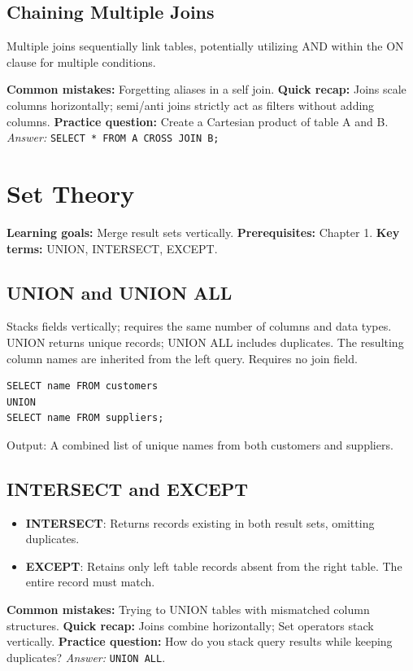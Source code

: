 \documentclass[12pt, a4paper]{article}
\begin{document}
\subsection{Chaining Multiple Joins}
Multiple joins sequentially link tables, potentially utilizing AND within the ON clause for multiple conditions.

\textbf{Common mistakes:} Forgetting aliases in a self join.
\textbf{Quick recap:} Joins scale columns horizontally; semi/anti joins strictly act as filters without adding columns.
\textbf{Practice question:} Create a Cartesian product of table A and B.
\textit{Answer:} \texttt{SELECT * FROM A CROSS JOIN B;}

\section{Set Theory}
\textbf{Learning goals:} Merge result sets vertically.
\textbf{Prerequisites:} Chapter 1.
\textbf{Key terms:} UNION, INTERSECT, EXCEPT.

\subsection{UNION and UNION ALL}
Stacks fields vertically; requires the same number of columns and data types. UNION returns unique records; UNION ALL includes duplicates. The resulting column names are inherited from the left query. Requires no join field.

\begin{verbatim}
SELECT name FROM customers
UNION
SELECT name FROM suppliers;
\end{verbatim}
Output: A combined list of unique names from both customers and suppliers.

\subsection{INTERSECT and EXCEPT}
\begin{itemize}
    \item \textbf{INTERSECT}: Returns records existing in both result sets, omitting duplicates.
    \item \textbf{EXCEPT}: Retains only left table records absent from the right table. The entire record must match.
\end{itemize}

\textbf{Common mistakes:} Trying to UNION tables with mismatched column structures.
\textbf{Quick recap:} Joins combine horizontally; Set operators stack vertically.
\textbf{Practice question:} How do you stack query results while keeping duplicates?
\textit{Answer:} \texttt{UNION ALL}.
\end{document}
